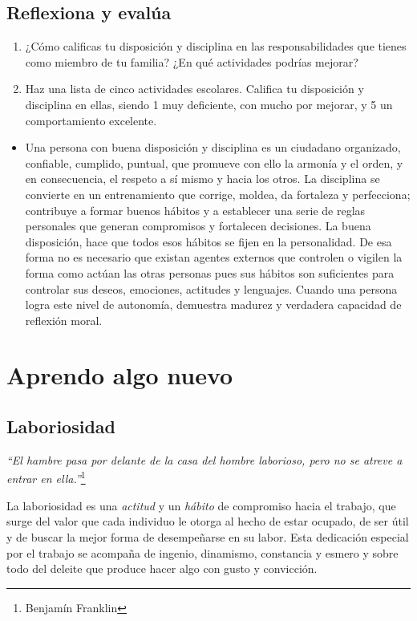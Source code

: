 \documentclass[10pt,twoside]{article}
\begin{document}
\subsection*{Reflexiona y eval\'{u}a}
 \begin{enumerate}
 \item ¿Cómo calificas tu disposición y disciplina en las
responsabilidades que tienes como miembro de tu familia?
¿En qué actividades podrías mejorar?
\item Haz una lista de cinco actividades escolares. Califica tu
disposición y disciplina en ellas, siendo 1 muy deficiente, con
mucho por mejorar, y 5 un comportamiento excelente.
 \end{enumerate}
 \begin{itemize}
 \item Una persona con buena disposición y disciplina es un
ciudadano organizado, confiable, cumplido, puntual,
que promueve con ello la armonía y el orden, y en
consecuencia, el respeto a sí mismo y hacia los otros.
La disciplina se convierte en un entrenamiento que
corrige, moldea, da fortaleza y perfecciona; contribuye
a formar buenos hábitos y a establecer una serie de
reglas personales que generan compromisos y fortalecen
decisiones. La buena disposición, hace que todos esos
hábitos se fijen en la personalidad. De esa forma no es
necesario que existan agentes externos que controlen
o vigilen la forma como actúan las otras personas pues
sus hábitos son suficientes para controlar sus deseos,
emociones, actitudes y lenguajes. Cuando una persona
logra este nivel de autonomía, demuestra madurez y
verdadera capacidad de reflexión moral.
 \end{itemize}
 \section*{Aprendo algo nuevo}
 \subsection*{Laboriosidad}
 \emph{“El hambre pasa por delante de la casa del hombre laborioso,
pero no se atreve a entrar en ella.”}\footnote{Benjamín Franklin
}

La laboriosidad es una \emph{actitud} y un \emph{hábito} de compromiso hacia
el trabajo, que surge del valor que cada individuo le otorga al
hecho de estar ocupado, de ser útil y de buscar la mejor forma de
desempeñarse en su labor. Esta dedicación especial por el trabajo
se acompaña de ingenio, dinamismo, constancia y esmero y sobre
todo del deleite que produce hacer algo con gusto y convicción.
\end{document}
